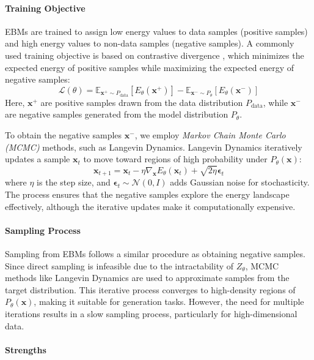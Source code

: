\paragraph{Training Objective}

EBMs are trained to assign low energy values to data samples (positive samples) and high energy values to non-data samples (negative samples). A commonly used training objective is based on contrastive divergence \cite{hinton2002training}, which minimizes the expected energy of positive samples while maximizing the expected energy of negative samples:
\[
\mathcal{L}(\theta) = \mathbb{E}_{\mathbf{x}^+ \sim P_{\text{data}}} [E_{\theta}(\mathbf{x}^+)] - \mathbb{E}_{\mathbf{x}^- \sim P_{\theta}} [E_{\theta}(\mathbf{x}^-)]
\]
Here, \( \mathbf{x}^+ \) are positive samples drawn from the data distribution \( P_{\text{data}} \), while \( \mathbf{x}^- \) are negative samples generated from the model distribution \( P_{\theta} \).

To obtain the negative samples \( \mathbf{x}^- \), we employ \textit{Markov Chain Monte Carlo (MCMC)} methods, such as Langevin Dynamics. Langevin Dynamics iteratively updates a sample \( \mathbf{x}_t \) to move toward regions of high probability under \( P_{\theta}(\mathbf{x}) \):
\[
\mathbf{x}_{t+1} = \mathbf{x}_t - \eta \nabla_{\mathbf{x}} E_{\theta}(\mathbf{x}_t) + \sqrt{2\eta} \mathbf{\epsilon}_t
\]
where \( \eta \) is the step size, and \( \mathbf{\epsilon}_t \sim \mathcal{N}(0, I) \) adds Gaussian noise for stochasticity. The process ensures that the negative samples explore the energy landscape effectively, although the iterative updates make it computationally expensive.

\paragraph{Sampling Process}

Sampling from EBMs follows a similar procedure as obtaining negative samples. Since direct sampling is infeasible due to the intractability of \( Z_{\theta} \), MCMC methods like Langevin Dynamics are used to approximate samples from the target distribution. This iterative process converges to high-density regions of \( P_{\theta}(\mathbf{x}) \), making it suitable for generation tasks. However, the need for multiple iterations results in a slow sampling process, particularly for high-dimensional data.

\paragraph{Strengths}


